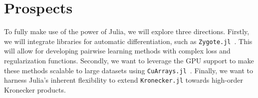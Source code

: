 \documentclass{juliacon}
\begin{document}
\section{Prospects}

To fully make use of the power of Julia, we will explore three directions. Firstly, we will integrate libraries for automatic differentiation, such as \texttt{Zygote.jl}~\cite{Innes2019}. This will allow for developing pairwise learning methods with complex loss and regularization functions. Secondly, we want to leverage the GPU support to make these methods scalable to large datasets using \texttt{CuArrays.jl}~\cite{Besard2019}. Finally, we want to harness Julia's inherent flexibility to extend \texttt{Kronecker.jl} towards high-order Kronecker products.


\end{document}
